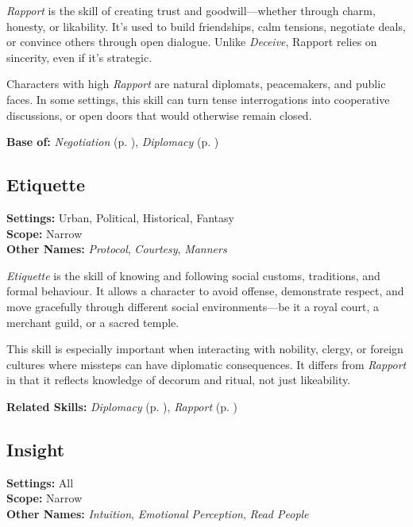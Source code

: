\emph{Rapport} is the skill of creating trust and goodwill—whether through charm, honesty, or likability. It’s used to build friendships, calm tensions, negotiate deals, or convince others through open dialogue. Unlike \emph{Deceive}, Rapport relies on sincerity, even if it’s strategic.

Characters with high \emph{Rapport} are natural diplomats, peacemakers, and public faces. In some settings, this skill can turn tense interrogations into cooperative discussions, or open doors that would otherwise remain closed.

\vspace{0.5\baselineskip}
\noindent\textbf{Base of:} \emph{Negotiation} (p. \pageref{skill:negotiation}), \emph{Diplomacy} (p. \pageref{skill:diplomacy})



\subsection{Etiquette}\label{skill:etiquette}
\textbf{Settings:} Urban, Political, Historical, Fantasy\\
\textbf{Scope:} Narrow\\
\textbf{Other Names:} \emph{Protocol}, \emph{Courtesy}, \emph{Manners}\\
\vspace{\baselineskip}

\emph{Etiquette} is the skill of knowing and following social customs, traditions, and formal behaviour. It allows a character to avoid offense, demonstrate respect, and move gracefully through different social environments—be it a royal court, a merchant guild, or a sacred temple.

This skill is especially important when interacting with nobility, clergy, or foreign cultures where missteps can have diplomatic consequences. It differs from \emph{Rapport} in that it reflects knowledge of decorum and ritual, not just likeability.

\vspace{0.5\baselineskip}
\noindent\textbf{Related Skills:} \emph{Diplomacy} (p. \pageref{skill:diplomacy}), \emph{Rapport} (p. \pageref{skill:rapport})



\subsection{Insight}\label{skill:insight}
\textbf{Settings:} All\\
\textbf{Scope:} Narrow\\
\textbf{Other Names:} \emph{Intuition}, \emph{Emotional Perception}, \emph{Read People}\\
\vspace{\baselineskip}

